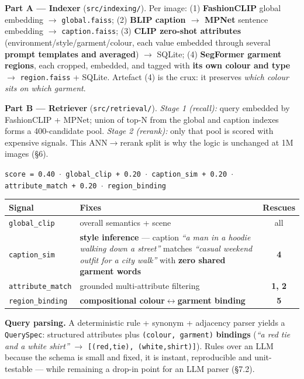 \documentclass[10pt,a4paper]{article}
\newcommand{\tcode}[1]{\texttt{\small #1}}
\begin{document}
\textbf{Part A --- Indexer} (\tcode{src/indexing/}). Per image: (1) \textbf{FashionCLIP} global
embedding $\rightarrow$ \tcode{global.faiss}; (2) \textbf{BLIP caption $\rightarrow$ MPNet} sentence
embedding $\rightarrow$ \tcode{caption.faiss}; (3) \textbf{CLIP zero-shot attributes}
(environment/style/garment/colour, each value embedded through several \textbf{prompt templates and
averaged}) $\rightarrow$ SQLite; (4) \textbf{SegFormer garment regions}, each cropped, embedded, and
tagged with \textbf{its own colour and type} $\rightarrow$ \tcode{region.faiss} + SQLite. Artefact (4)
is the crux: it preserves \emph{which colour sits on which garment}.

\textbf{Part B --- Retriever} (\tcode{src/retrieval/}). \emph{Stage 1 (recall):} query embedded by
FashionCLIP + MPNet; union of top-N from the global and caption indexes forms a 400-candidate pool.
\emph{Stage 2 (rerank):} only that pool is scored with expensive signals. This ANN$\rightarrow$rerank
split is why the logic is unchanged at 1M images (\S6).

\begin{center}
\tcode{score = 0.40\,$\cdot$\,global\_clip + 0.20\,$\cdot$\,caption\_sim + 0.20\,$\cdot$\,attribute\_match + 0.20\,$\cdot$\,region\_binding}
\end{center}

\begin{center}\small
\begin{tabularx}{\textwidth}{@{}>{\raggedright\arraybackslash}p{}Xc@{}}
\toprule
\textbf{Signal} & \textbf{Fixes} & \textbf{Rescues} \\
\midrule
\tcode{global\_clip} & overall semantics + scene & all \\
\tcode{caption\_sim} & \textbf{style inference} --- caption \emph{``a man in a hoodie walking down a street''} matches \emph{``casual weekend outfit for a city walk''} with \textbf{zero shared garment words} & \textbf{4} \\
\tcode{attribute\_match} & grounded multi-attribute filtering & \textbf{1, 2} \\
\tcode{region\_binding} & \textbf{compositional colour$\leftrightarrow$garment binding} & \textbf{5} \\
\bottomrule
\end{tabularx}
\end{center}

\textbf{Query parsing.} A deterministic rule + synonym + adjacency parser yields a
\tcode{QuerySpec}: structured attributes plus \tcode{(colour, garment)} \textbf{bindings}
(\emph{``a red tie and a white shirt''} $\rightarrow$ \tcode{[(red,tie), (white,shirt)]}). Rules over
an LLM because the schema is small and fixed, it is instant, reproducible and unit-testable ---
while remaining a drop-in point for an LLM parser (\S7.2).
\end{document}
